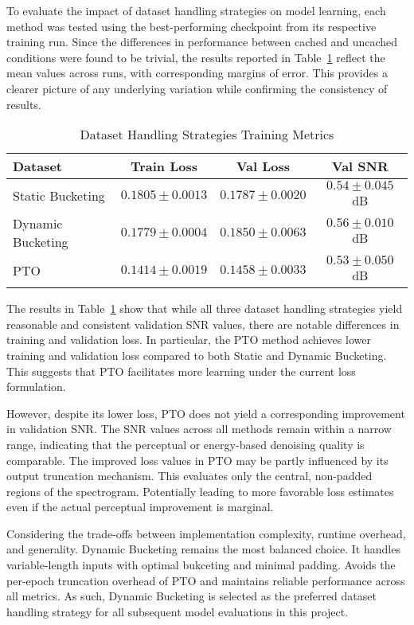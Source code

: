 To evaluate the impact of dataset handling strategies on model learning, each method was tested using the best-performing checkpoint from its respective training run. Since the differences in performance between cached and uncached conditions were found to be trivial, the results reported in Table~\ref{tab:dataset_performance} reflect the mean values across runs, with corresponding margins of error. This provides a clearer picture of any underlying variation while confirming the consistency of results.

\vspace{1em}
\begin{table}[H]
\centering
\caption{Dataset Handling Strategies Training Metrics}
\label{tab:dataset_performance}
\begin{tabular}{|l|c|c|c|}
\hline
\textbf{Dataset} & \textbf{Train Loss} & \textbf{Val Loss} & \textbf{Val SNR} \\
\hline
Static Bucketing  & \(0.1805 \pm 0.0013\)  & \(0.1787 \pm 0.0020\)  & \(0.54 \pm 0.045\) dB \\
Dynamic Bucketing & \(0.1779 \pm 0.0004\)  & \(0.1850 \pm 0.0063\)  & \(0.56 \pm 0.010\) dB \\
PTO               & \(0.1414 \pm 0.0019\)  & \(0.1458 \pm 0.0033\)  & \(0.53 \pm 0.050\) dB \\
\hline
\end{tabular}
\end{table}

The results in Table~\ref{tab:dataset_performance} show that while all three dataset handling strategies yield reasonable and consistent validation SNR values, there are notable differences in training and validation loss. In particular, the PTO method achieves lower training and validation loss compared to both Static and Dynamic Bucketing. This suggests that PTO facilitates more learning under the current loss formulation.

However, despite its lower loss, PTO does not yield a corresponding improvement in validation SNR. The SNR values across all methods remain within a narrow range, indicating that the perceptual or energy-based denoising quality is comparable. The improved loss values in PTO may be partly influenced by its output truncation mechanism. This evaluates only the central, non-padded regions of the spectrogram. Potentially leading to more favorable loss estimates even if the actual perceptual improvement is marginal.

Considering the trade-offs between implementation complexity, runtime overhead, and generality. Dynamic Bucketing remains the most balanced choice. It handles variable-length inputs with optimal bukceting and minimal padding. Avoids the per-epoch truncation overhead of PTO and maintains reliable performance across all metrics. As such, Dynamic Bucketing is selected as the preferred dataset handling strategy for all subsequent model evaluations in this project.

